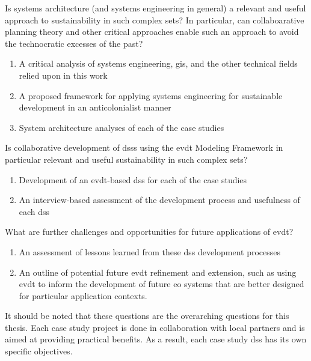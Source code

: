 \begin{packed_enum}
	\item{Is systems architecture (and systems engineering in general) a relevant and useful approach to sustainability in such complex \ac{sets}? In particular, can collaboarative planning theory and other critical approaches enable such an approach to avoid the technocratic excesses of the past?}
	\begin{enumerate}[label=\emph{\alph*}),itemsep=0pt,parsep=0pt]
		\item{A critical analysis of systems engineering, \ac{gis}, and the other technical fields relied upon in this work}
		\item{A proposed framework for applying systems engineering for sustainable development in an anticolonialist manner}
		\item{System architecture analyses of each of the case studies}
	\end{enumerate}
	\item{Is collaborative development of \acp{dss} using the  \ac{evdt} Modeling Framework in particular relevant and useful sustainability in such complex \ac{sets}?}
	\begin{enumerate}[label=\emph{\alph*}),itemsep=0pt,parsep=0pt]
		\item{Development of an \ac{evdt}-based \ac{dss} for each of the case studies}
		\item{An interview-based assessment of the development process and usefulness of each \ac{dss}}
	\end{enumerate}
	\item{What are further challenges and opportunities for future applications of \ac{evdt}?}
	\begin{enumerate}[label=\emph{\alph*}),itemsep=0pt,parsep=0pt]
		\item{An assessment of lessons learned from these \ac{dss} development processes}
		\item{An outline of potential future \ac{evdt} refinement and extension, such as using \ac{evdt} to inform the development of future \ac{eo} systems that are better designed for particular application contexts.}
	\end{enumerate}
\end{packed_enum}

It should be noted that these questions are the overarching questions for this thesis. Each case study project is done in collaboration with local partners and is aimed at providing practical benefits. As a result, each case study \ac{dss} has its own specific objectives.

